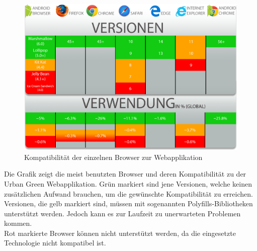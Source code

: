 \begin{figure}[ht]
    \centering
	\includegraphics[width=1\textwidth]{images/browser-support}
	\caption{Kompatibilität der einzelnen Browser zur Webapplikation}
\end{figure}

Die Grafik zeigt die meist benutzten Browser und deren Kompatibilität zu der Urban Green Webapplikation. Grün markiert sind jene Versionen, welche keinen zusätzlichen Aufwand brauchen, um die gewünschte Kompatibilität zu erreichen. Versionen, die gelb markiert sind, müssen mit sogenannten Polyfills-Bibliotheken unterstützt werden. Jedoch kann es zur Laufzeit zu unerwarteten Problemen kommen. \\
Rot markierte Browser können nicht unterstützt werden, da die eingesetzte Technologie nicht kompatibel ist.

